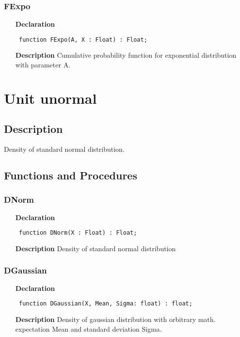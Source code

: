 \documentclass[12pt,a4paper,oneside]{report}
\newcommand{\lmath}[1]{   %
	\marginpar{\vspace{#1} 
		\begin{flushright}
			LMath
	\end{flushright} }
}
\newcommand{\declarationitem}[1]{\textbf{#1}}
\newcommand{\descriptiontitle}[1]{\textbf{#1}}
\newcommand{\code}[1]{\texttt{#1}}
\begin{document}
\subsubsection{FExpo}
\label{uexpdist-FExpo}
\begin{itemize}\item[\declarationitem{Declaration}\hfill]
	\begin{flushleft}
		\code{
			function FExpo(A, X : Float) : Float;}
	\end{flushleft}
	\item[\descriptiontitle{Description}]
	Cumulative probability function for exponential distribution with parameter A.
\end{itemize}
\section{Unit unormal}
\label{unormal}
\subsection{Description}
Density of standard normal distribution. 
\subsection{Functions and Procedures}
\subsubsection{DNorm}
\label{unormal-DNorm}
\begin{itemize}\item[\declarationitem{Declaration}\hfill]
	\begin{flushleft}
		\code{
			function DNorm(X : Float) : Float;}
	\end{flushleft}
	\item[\descriptiontitle{Description}]
	Density of standard normal distribution
\end{itemize}
\subsubsection{DGaussian}\lmath{-24pt}
\label{unormal-DGaussian}
\begin{itemize}\item[\declarationitem{Declaration}\hfill]
	\begin{flushleft}
		\code{
			function DGaussian(X, Mean, Sigma: float) : float;}
	\end{flushleft}
	\item[\descriptiontitle{Description}]
	Density of gaussian distribution with orbitrary math. expectation Mean and standard deviation Sigma.
\end{itemize}
\end{document}
